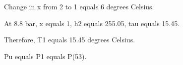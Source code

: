 Change in x from 2 to 1 equals 6 degrees Celsius.

At 8.8 bar, x equals 1, h2 equals 255.05, tau equals 15.45.

Therefore, T1 equals 15.45 degrees Celsius.

Pu equals P1 equals P(53).